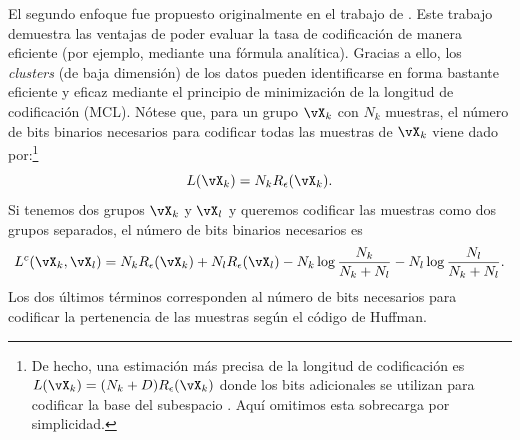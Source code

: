 \documentclass[../../book-main.tex]{subfiles}
\begin{document}
El segundo enfoque fue propuesto originalmente en el trabajo de
\cite{ma2007segmentation}. Este trabajo demuestra las ventajas de poder
evaluar la tasa de codificación de manera eficiente (por ejemplo, mediante una fórmula
analítica). Gracias a ello, los \textit{clusters} (de baja dimensión) de los datos pueden
identificarse en forma bastante eficiente y eficaz mediante el principio de
minimización de la longitud de codificación (MCL). Nótese que, para un grupo $\vX_k$ con
$N_k$ muestras, el número de bits binarios necesarios para codificar todas las
muestras de $\vX_k$ viene dado por:\footnote{De hecho, una estimación más precisa
    de la longitud de codificación es $L(\vX_k) = (N_k+D) R_\epsilon(\vX_k)$
    donde los bits adicionales se utilizan para codificar la base del subespacio
\cite{ma2007segmentation}. Aquí omitimos esta sobrecarga por simplicidad.}
\begin{equation}
    L(\vX_k) = N_k R_\epsilon(\vX_k).
\end{equation}
Si tenemos dos grupos $\vX_k$ y $\vX_l$ y queremos codificar las
muestras como dos grupos separados, el número de bits binarios necesarios es
\begin{equation*}
    L^c(\vX_k, \vX_l) = N_k R_\epsilon(\vX_k) + N_l R_\epsilon(\vX_l) -
    N_k \log\frac{N_k}{N_k + N_l} - N_l \log\frac{N_l}{N_k + N_l}.
\end{equation*}
Los dos últimos términos corresponden al número de bits necesarios para codificar la
pertenencia de las muestras según el código de Huffman.
\end{document}
